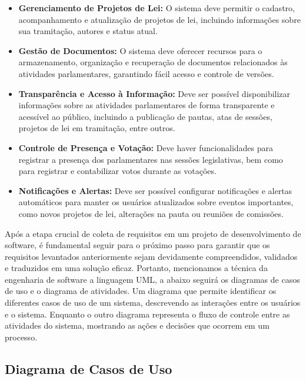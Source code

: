 \documentclass[12pt]{article}
\begin{document}
\begin{itemize}
	\item \textbf{Gerenciamento de Projetos de Lei:} O sistema deve permitir o cadastro, acompanhamento e atualização de projetos de lei, incluindo informações sobre sua tramitação, autores e status atual.
	
	\item \textbf{Gestão de Documentos:} O sistema deve oferecer recursos para o armazenamento, organização e recuperação de documentos relacionados às atividades parlamentares, garantindo fácil acesso e controle de versões.
	
	\item \textbf{Transparência e Acesso à Informação:} Deve ser possível disponibilizar informações sobre as atividades parlamentares de forma transparente e acessível ao público, incluindo a publicação de pautas, atas de sessões, projetos de lei em tramitação, entre outros.
	
	\item \textbf{Controle de Presença e Votação:} Deve haver funcionalidades para registrar a presença dos parlamentares nas sessões legislativas, bem como para registrar e contabilizar votos durante as votações.
	
	\item \textbf{Notificações e Alertas:} Deve ser possível configurar notificações e alertas automáticos para manter os usuários atualizados sobre eventos importantes, como novos projetos de lei, alterações na pauta ou reuniões de comissões.
\end{itemize}

Após a etapa crucial de coleta de requisitos em um projeto de desenvolvimento de software, é fundamental seguir para o próximo passo para garantir que os requisitos levantados anteriormente sejam devidamente compreendidos, validados e traduzidos em uma solução eficaz. Portanto, mencionamos a técnica da engenharia de software a linguagem UML, a abaixo seguirá os diagramas de casos de uso e o diagrama de atividades. Um diagrama que permite identificar os diferentes casos de uso de um sistema, descrevendo as interações entre os usuários e o sistema. Enquanto o outro diagrama representa o fluxo de controle entre as atividades do sistema, mostrando as ações e decisões que ocorrem em um processo.


\subsection{Diagrama de Casos de Uso}
\end{document}
